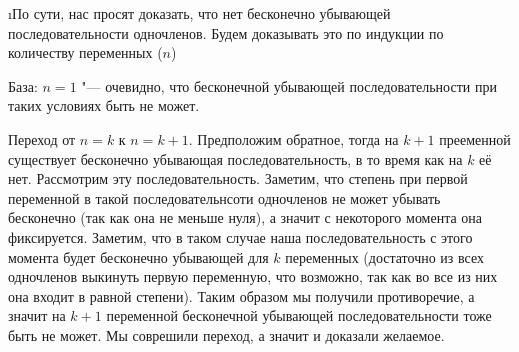 \i По сути, нас просят доказать, что нет бесконечно убывающей последовательности одночленов. Будем доказывать это по индукции по количеству переменных ($n$)
\par База: $n = 1$ "--- очевидно, что бесконечной убывающей последовательности при таких условиях быть не может.
\par Переход от $n = k$ к $n = k+1$. Предположим обратное, тогда на $k+1$ прееменной существует бесконечно убывающая последовательность, в то время как на $k$ её нет. Рассмотрим эту последовательность. Заметим, что степень при первой переменной в такой последовательнсоти одночленов не может убывать бесконечно (так как она не меньше нуля), а значит с некоторого момента она фиксируется. Заметим, что в таком случае наша последовательность с этого момента будет бесконечно убывающей для $k$ переменных (достаточно из всех одночленов выкинуть первую переменную, что возможно, так как во все из них она входит в равной степени). Таким образом мы получили противоречие, а значит на $k+1$ переменной бесконечной убывающей последовательности тоже быть не может. Мы соврешили переход, а значит и доказали желаемое.